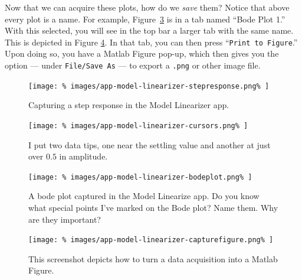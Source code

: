 Now that we can acquire these plots, how do we \emph{save} them? Notice that
above every plot is a name. For example, Figure~\ref{fig:app1:bodeplot} is
in a tab named ``Bode Plot 1.'' With this selected, you will see in the top
bar a larger tab with the same name. This is depicted in Figure
\ref{fig:app1:capturefigure}. In that tab, you can then press
``\texttt{Print to Figure}.'' Upon doing so, you have a Matlab Figure pop-up,
which then gives you the option --- under \texttt{File/Save As} --- to
export a \texttt{.png} or other image file.
%
\begin{figure}
  \centering
  \texttt{[image: \%
    images/app-model-linearizer-stepresponse.png\%
  ]}
  \caption[Capturing a Step Response in the Model Linearizer App]{%
    Capturing a step response in the Model Linearizer app.
  }
  \label{fig:app1:stepresponse}
\end{figure}
%
\begin{figure}
  \centering
  \texttt{[image: \%
    images/app-model-linearizer-cursors.png\%
  ]}
  \caption[Data Tips in Matlab Figures]{%
    I put two data tips, one near the settling value and another at
    just over \(0.5\) in amplitude.
  }
  \label{fig:app1:cursors}
\end{figure}
%
\begin{figure}
  \centering
  \texttt{[image: \%
    images/app-model-linearizer-bodeplot.png\%
  ]}
  \caption[Bode Plot captured in the Model Linearizer App]{%
    A bode plot captured in the Model Linearize app. Do you know what special
    points I've marked on the Bode plot? Name them. Why are they important?
  }
  \label{fig:app1:bodeplot}
\end{figure}
%
\begin{figure}
  \centering
  \texttt{[image: \%
    images/app-model-linearizer-capturefigure.png\%
  ]}
  \caption[Acquiring a Figure in the Model Linearizer App]{%
    This screenshot depicts how to turn a data acquisition into a Matlab
    Figure.
  }
  \label{fig:app1:capturefigure}
\end{figure}
%
